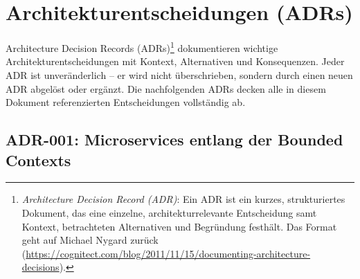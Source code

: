 \section{Architekturentscheidungen (ADRs)}

Architecture Decision Records (ADRs)\footnote{%
  \textit{Architecture Decision Record (ADR)}: Ein ADR ist ein kurzes, strukturiertes Dokument,
  das eine einzelne, architekturrelevante Entscheidung samt Kontext, betrachteten Alternativen
  und Begründung festhält. Das Format geht auf Michael Nygard zurück
  (\url{https://cognitect.com/blog/2011/11/15/documenting-architecture-decisions}).}
dokumentieren wichtige Architekturentscheidungen mit Kontext, Alternativen und Konsequenzen.
Jeder ADR ist unveränderlich – er wird nicht überschrieben, sondern durch einen neuen ADR
abgelöst oder ergänzt. Die nachfolgenden ADRs decken alle in diesem Dokument referenzierten
Entscheidungen vollständig ab.

\subsection{ADR-001: Microservices entlang der Bounded Contexts}

